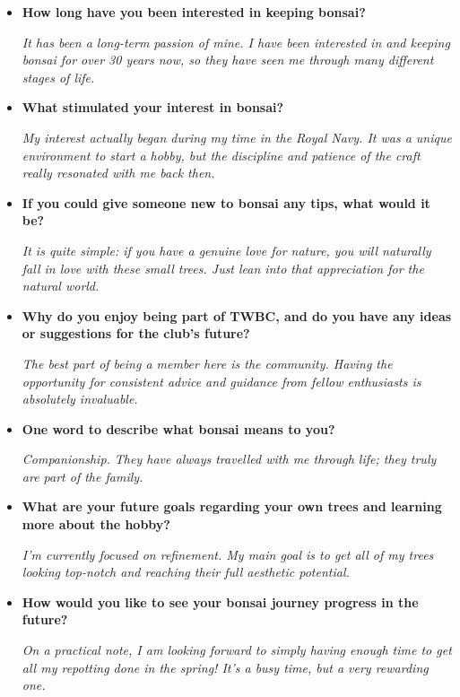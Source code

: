 \begin{itemize}
    \emph{For me, it is the trees themselves. They aren't just plants to me; they are like family. Watching them grow and change over the decades provides all the inspiration I need.}

    \item \textbf{How long have you been interested in keeping bonsai?}

    \emph{It has been a long-term passion of mine. I have been interested in and keeping bonsai for over 30 years now, so they have seen me through many different stages of life.}

    \item \textbf{What stimulated your interest in bonsai?}

    \emph{My interest actually began during my time in the Royal Navy. It was a unique environment to start a hobby, but the discipline and patience of the craft really resonated with me back then.}

    \item \textbf{If you could give someone new to bonsai any tips, what would it be?}

    \emph{It is quite simple: if you have a genuine love for nature, you will naturally fall in love with these small trees. Just lean into that appreciation for the natural world.}

    \item \textbf{Why do you enjoy being part of TWBC, and do you have any ideas or suggestions for the club's future?}

    \emph{The best part of being a member here is the community. Having the opportunity for consistent advice and guidance from fellow enthusiasts is absolutely invaluable.}

    \item \textbf{One word to describe what bonsai means to you?}

    \emph{Companionship. They have always travelled with me through life; they truly are part of the family.}

    \item \textbf{What are your future goals regarding your own trees and learning more about the hobby?}

    \emph{I'm currently focused on refinement. My main goal is to get all of my trees looking top-notch and reaching their full aesthetic potential.}

    \item \textbf{How would you like to see your bonsai journey progress in the future?}

    \emph{On a practical note, I am looking forward to simply having enough time to get all my repotting done in the spring! It’s a busy time, but a very rewarding one.}
\end{itemize}

